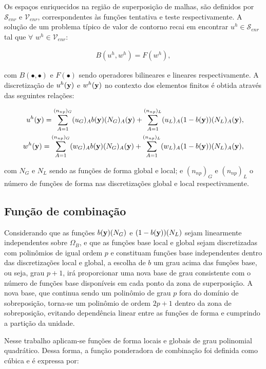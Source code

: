 Os espaços enriquecidos na região de superposição de malhas, são definidos por $\mathcal{S}_{enr}$ e $\mathcal{V}_{enr}$, correspondentes às funções tentativa e teste respectivamente. A solução de um problema típico de valor de contorno recai em encontrar $u^{h} \in \mathcal{S}_{enr}$ tal que $\forall$ $ w^{h} \in \mathcal{V}_{enr}$: 

\begin{align}
B(u^{h},w^{h}) = F(w^{h}),
\end{align}

\noindent com $B(\bullet,\bullet)$ e $F(\bullet)$ sendo operadores bilineares e lineares respectivamente. A discretização de $u^{h}(\mathbf{y})$ e $w^{h}(\mathbf{y})$ no contexto dos elementos finitos é obtida através das seguintes relações:

\begin{align}
u^{h}(\mathbf{y}) = \sum_{A = 1}^{(n_{np})_G} (u_{G})_{A}b(\mathbf{y})(N_{G})_{A}(\mathbf{y}) + \sum_{A = 1}^{(n_{np})_L} (u_{L})_{A}(1-b(\mathbf{y}))(N_{L})_{A}(\mathbf{y}),\label{eq:u_mod} \\ 
w^{h}(\mathbf{y}) = \sum_{A = 1}^{(n_{np})_G} (w_{G})_{A}b(\mathbf{y})(N_{G})_{A}(\mathbf{y}) + \sum_{A = 1}^{(n_{np})_L} (w_{L})_{A}(1-b(\mathbf{y}))(N_{L})_{A}(\mathbf{y}), \label{eq:w_mod}
\end{align}

\noindent com $N_{G}$ e $N_{L}$ sendo as funções de forma global e local; e $(n_{np})_G$ e $(n_{np})_L$ o número de funções de forma nas discretizações global e local respectivamente. 

\subsection{Função de combinação}

Considerando que as funções $b(\mathbf{y})(N_{G})$ e $(1-b(\mathbf{y}))(N_{L})$ sejam linearmente independentes sobre $\Omega_{B}$, e que as funções base local e global sejam discretizadas com polinômios de igual ordem $p$ e constituam funções base independentes dentro das discretizações local e global, a escolha de $b$ um grau acima das funções base, ou seja, grau $p+1$, irá proporcionar uma nova base de grau consistente com o número de funções base disponíveis em cada ponto da zona de superposição. A nova base, que continua sendo um polinômio de grau $p$ fora do domínio de sobreposição, torna-se um polinômio de ordem $2p+1$ dentro da zona de sobreposição, evitando dependência linear entre as funções de forma e cumprindo a partição da unidade.

Nesse trabalho aplicam-se funções de forma locais e globais de grau polinomial quadrático. Dessa forma, a função ponderadora de combinação foi definida como cúbica e é expressa por:

